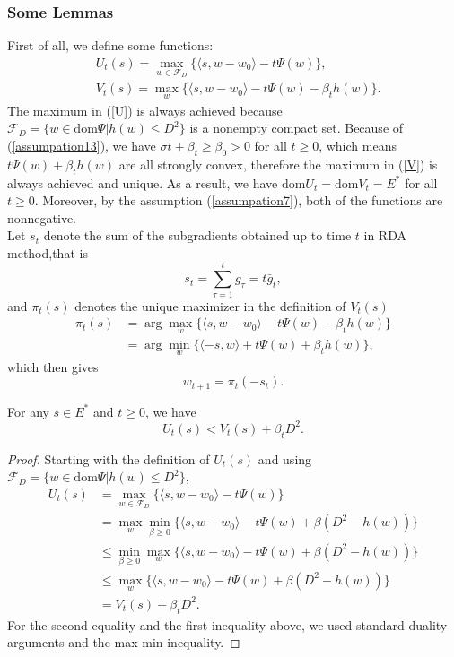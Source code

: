 \subsubsection{Some Lemmas}
First of all, we define some functions:
\begin{align}
	&U_t(s)=\max\limits_{w\in \mathcal{F}_D} \{ \langle s,w-w_0  \rangle-t\Psi(w)\},\label{U}\\
	&V_t(s)=\max\limits_{w} \{ \langle s,w-w_0  \rangle-t\Psi(w) - \beta_t h(w)\}\label{V}.
\end{align}
The maximum in (\ref{U}) is always achieved because $\mathcal{F}_D=\{w\in\text{dom}\Psi|h(w)\leq D^2\}$ is a nonempty compact set. Because of (\ref{assumpation13}), we have $\sigma t+\beta_t \geq \beta_0 > 0$ for all $t\geq0$, which means  $t\Psi(w)+\beta_t h(w)$ are all strongly convex, therefore the maximum in (\ref{V}) is always achieved and unique. As a result, we have $\text{dom} U_t= \text{dom} V_t = E^{\ast}$ for all $t\geq 0$. Moreover, by the assumption (\ref{assumpation7}), both of the functions are nonnegative.\\
Let $s_t$ denote the sum of the subgradients obtained up to time $t$ in RDA method,that is
\begin{equation}\label{42}
	s_t=\sum\limits_{\tau =1}^{t} g_{\tau} = t \bar{g}_t,
\end{equation}
and $\pi_t(s)$  denotes the unique maximizer in the definition of $V_t(s)$
\begin{equation}
	\begin{split}
		\pi_t(s) &= \arg\max\limits_{w} \{ \langle s,w-w_0  \rangle-t\Psi(w) - \beta_t h(w)\}\\
		&= \arg\min\limits_{w} \{ \langle -s,w \rangle + t\Psi(w) + \beta_t h(w)\},
	\end{split}
\end{equation}
which then gives 
\begin{equation}
	w_{t+1} = \pi_t(-s_t).
\end{equation}
\begin{lemma}\label{lemma9}
	For any $s\in E^{\ast}$ and $t\geq 0$, we have
	\begin{equation}
		U_t(s)<V_t(s)+\beta_t D^2.
	\end{equation} 
\end{lemma}	
\begin{proof}
	Starting with the definition of $U_t(s)$ and using $\mathcal{F}_D=\{w\in\text{dom}\Psi|h(w)\leq D^2\}$,
	$$
	\begin{aligned}
	U_t(s) &= \max_{w\in\mathcal{F}_D} \{\langle s,w-w_0\rangle - t \Psi(w) \} \\
	&=\max_w \min_{\beta \geq 0} \{\langle s,w-w_0\rangle - t \Psi(w) +\beta(D^2-h(w)) \} \\
	&\leq \min_{\beta \geq 0} \max_w  \{\langle s,w-w_0\rangle - t \Psi(w) +\beta(D^2-h(w)) \} \\
	&\leq  \max_w  \{\langle s,w-w_0\rangle - t \Psi(w) +\beta(D^2-h(w)) \} \\
	&= V_t(s) +\beta_t D^2.
	\end{aligned}
	$$
	For the second equality and the first inequality above, we used standard duality arguments and the max-min inequality.
\end{proof}
